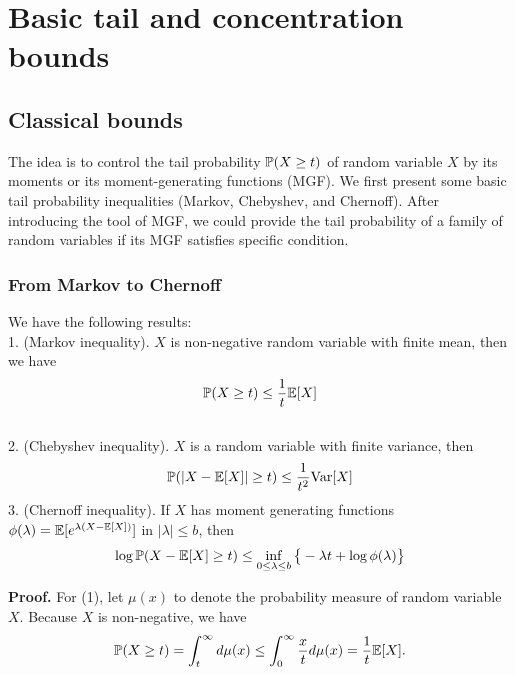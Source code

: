 \section{Basic tail and concentration bounds}

\subsection{Classical bounds}

The idea is to control the tail probability ${\mathbb{P}}(X\ge t)$ of random variable $X$ by its moments or its moment-generating functions (MGF). We first present some basic tail probability inequalities (Markov, Chebyshev, and Chernoff). After introducing the tool of MGF, we could provide the tail probability of a family of random variables if its MGF satisfies specific condition.

\subsubsection{From Markov to Chernoff}

\begin{claim} We have the following results:\\
1. (Markov inequality). $X$ is non-negative random variable with finite mean, then we have
\begin{equation}
    {\mathbb{P}}(X\ge t) \le \frac{1}{t} {\mathbb{E}}[X]
\end{equation}\\
2. (Chebyshev inequality). $X$ is a random variable with finite variance, then 
\begin{equation}
    {\mathbb{P}}(|X-{\mathbb{E}}[X]|\ge t) \le \frac{1}{t^2} {\mathrm{Var}}[X]
\end{equation}
3. (Chernoff inequality). If $X$ has moment generating functions $\phi(\lambda)={\mathbb{E}}[e^{\lambda(X-{\mathbb{E}}[X])}]$ in $|\lambda|\le b$, then 
\begin{equation}
\label{eqn:chernoff}
    \log {\mathbb{P}}(X-{\mathbb{E}}[X] \ge t)\le \inf_{0\le \lambda\le b}\big\{ -\lambda t + \log \phi(\lambda) \big\}
\end{equation}
\end{claim}

\noindent \textbf{Proof.} For (1), let $\mu(x)$ to denote the probability measure of random variable $X$. Because $X$ is non-negative, we have
\begin{equation*}
    {\mathbb{P}}(X\ge t)=\int_{t}^{\infty} d\mu(x) \le \int_{0}^{\infty} \frac{x}{t} d\mu(x) = \frac{1}{t} {\mathbb{E}}[X].
\end{equation*}

